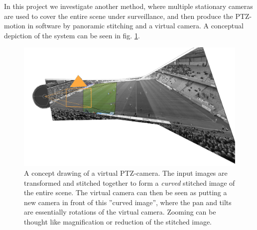 In this project we investigate another method, where multiple stationary cameras are used to cover the entire scene under surveillance, and then produce the PTZ-motion in software by panoramic stitching and a virtual camera.
A conceptual depiction of the system can be seen in fig. \ref{fig:comp}.

\begin{figure}[H]
	\centering
	\includegraphics[width=0.7\columnwidth]{../results/images/PTZ_comp.png}
        \caption{A concept drawing of a virtual PTZ-camera. The input images are transformed and stitched together to form a {\it curved} stitched image of the entire scene. The virtual camera can then be seen as putting a new camera in front of this ''curved image'', where the pan and tilts are essentially rotations of the virtual camera. Zooming can be thought like magnification or reduction of the stitched image.}
	\label{fig:comp}
\end{figure}

